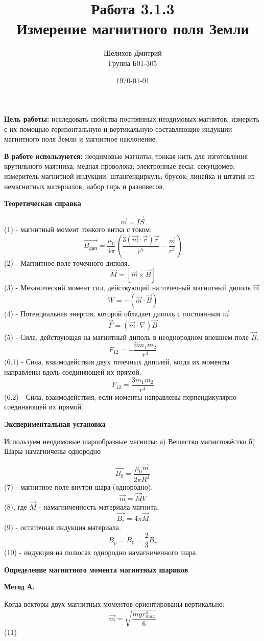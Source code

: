 \documentclass[a4paper,12pt]{article}
\author{Шелихов Дмитрий\\Группа Б01-305}
\title{\textbf{Работа 3.1.3\\Измерение магнитного поля Земли}}
\date{\today}
\begin{document}
 

\maketitle

\textbf{Цель работы:} исследовать свойства постоянных неодимовых магнитов; измерить с их помощью горизонтальную и вертикальную составляющие индукции магнитного поля Земли и магнитное наклонение.

\textbf{В работе используются:} неодимовые магниты; тонкая нить для изготовления крутильного маятника; медная проволока; электронные весы; секундомер; измеритель магнитной индукции; штангенциркуль; брусок; линейка и штатив из немагнитных материалов; набор гирь и разновесов.

\noindent\textbf{Теоретическая справка}

$$ \vec{m} = I\vec{S} $$ (1) - магнитный момент тонкого витка с током. 
$$ \vec {B_{дип}} = \frac {\mu_0}{4\pi}(\frac {3(\vec {m} \cdot \vec{r})\vec{r}}{r^5} - \frac {\vec{m}}{r^3})  $$ (2) - Магнитное поле точечного диполя. 
$$ \vec{M} = [\vec{m} \times \vec{B}]  $$ (3) - Механический момент сил, действующий на точечный магнитный диполь $\vec{m}$ 
$$ W = -(\vec{m} \cdot \vec{B})  $$ (4) - Потенциальная энергия, которой обладает диполь с постоянным $\vec{m}$
$$ \vec{F} = (\vec{m} \cdot \nabla)\vec{B}  $$ (5) - Сила, действующая на магнитный диполь в неоднородном внешнем поле $\vec{B}$.
$$ F_{12} = -\frac {6m_1m_2}{r^4}  $$ (6.1) - Сила, взаимодействия двух точечных диполей, когда их моменты направлены вдоль соединяющей их прямой.
$$ F_{12} = \frac {3m_1m_2}{r^4}  $$ (6.2) - Сила, взаимодействия, если моменты направлены перпендикулярно соединяющей их прямой.

\noindent\textbf{Экспериментальная установка}

Используем неодимовые шарообразные магниты: 
	а) Вещество магнитожёстко
	б) Шары намагничены однородно

$$ \vec {B_0} = \frac {\mu_0 \vec{m}}{2\pi R^3} $$ (7) - магнитное поле внутри шара (однородно).
$$ \vec {m} = \vec{M}V $$ (8), где $\vec{M}$ - намагниченность материала магнита.
$$ \vec {B_r} = 4\pi\vec{M}  $$ (9) - остаточная индукция материала. 
$$ B_p = B_0 = \frac {2}{3}B_r  $$ (10) - индукция на полюсах однородно намагниченного шара. 

\noindent\textbf{Определение магнитного момента магнитных шариков}

\textbf{Метод А.} 

Когда векторы двух магнитных моментов ориентированы вертикально: $$ \vec{m} = \sqrt{\frac{mg{r_{max}^4}}{6}} $$ (11) 
\end{document}

